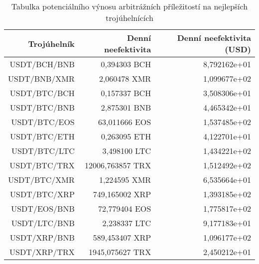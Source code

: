 \begin{table}\centering
\caption{Tabulka potenciálního výnosu arbitrážních příležitostí na nejlepších trojúhelnících}
\label{table_gains_best}
\begin{tabular}{|| r | r | r ||}\hline Trojúhelník & Denní neefektivita & Denní neefektivita (USD)\\ [0.5ex]
 \hline\hline USDT/BCH/BNB & 0,394303 BCH & 8,792162e+01\\ 
 \hline USDT/BNB/XMR & 2,060478 XMR & 1,099677e+02\\ 
 \hline USDT/BTC/BCH & 0,157337 BCH & 3,508306e+01\\ 
 \hline USDT/BTC/BNB & 2,875301 BNB & 4,465342e+01\\ 
 \hline USDT/BTC/EOS & 63,011666 EOS & 1,537485e+02\\ 
 \hline USDT/BTC/ETH & 0,263095 ETH & 4,122701e+01\\ 
 \hline USDT/BTC/LTC & 3,498100 LTC & 1,434221e+02\\ 
 \hline USDT/BTC/TRX & 12006,763857 TRX & 1,512492e+02\\ 
 \hline USDT/BTC/XMR & 1,224595 XMR & 6,535664e+01\\ 
 \hline USDT/BTC/XRP & 749,165002 XRP & 1,393185e+02\\ 
 \hline USDT/EOS/BNB & 72,779404 EOS & 1,775817e+02\\ 
 \hline USDT/LTC/BNB & 2,238337 LTC & 9,177183e+01\\ 
 \hline USDT/XRP/BNB & 589,453407 XRP & 1,096177e+02\\ 
 \hline USDT/XRP/TRX & 1945,075627 TRX & 2,450212e+01\\ 
 \hline
\end{tabular}
\end{table}